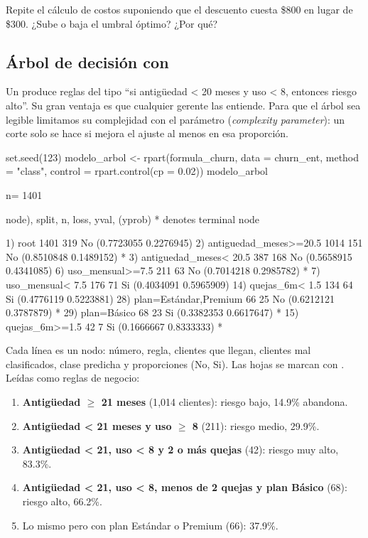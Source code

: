 \begin{hazlotu}
Repite el cálculo de costos suponiendo que el descuento cuesta \$800 en lugar
de \$300. ¿Sube o baja el umbral óptimo? ¿Por qué?
\end{hazlotu}

\subsection{Árbol de decisión con \texorpdfstring{}{rpart}}

Un  produce reglas del tipo ``si antigüedad < 20
meses y uso < 8, entonces riesgo alto''. Su gran ventaja es que cualquier
gerente las entiende. Para que el árbol sea legible limitamos su complejidad
con el parámetro  (\emph{complexity parameter}): un corte solo se
hace si mejora el ajuste al menos en esa proporción.

\begin{rcode}
set.seed(123)
modelo_arbol <- rpart(formula_churn, data = churn_ent, method = "class",
                      control = rpart.control(cp = 0.02))
modelo_arbol
\end{rcode}

\begin{rsalida}
n= 1401 

node), split, n, loss, yval, (yprob)
      * denotes terminal node

 1) root 1401 319 No (0.7723055 0.2276945)  
   2) antiguedad_meses>=20.5 1014 151 No (0.8510848 0.1489152) *
   3) antiguedad_meses< 20.5 387 168 No (0.5658915 0.4341085)  
     6) uso_mensual>=7.5 211  63 No (0.7014218 0.2985782) *
     7) uso_mensual< 7.5 176  71 Si (0.4034091 0.5965909)  
      14) quejas_6m< 1.5 134  64 Si (0.4776119 0.5223881)  
        28) plan=Estándar,Premium 66  25 No (0.6212121 0.3787879) *
        29) plan=Básico 68  23 Si (0.3382353 0.6617647) *
      15) quejas_6m>=1.5 42   7 Si (0.1666667 0.8333333) *
\end{rsalida}

Cada línea es un nodo: número, regla, clientes que llegan, clientes mal
clasificados, clase predicha y proporciones (No, Si). Las hojas se marcan con
\codigo{*}. Leídas como reglas de negocio:

\begin{enumerate}
  \item \textbf{Antigüedad $\geq$ 21 meses} (1{,}014 clientes): riesgo bajo,
        14.9\% abandona.
  \item \textbf{Antigüedad < 21 meses y uso $\geq$ 8} (211): riesgo medio,
        29.9\%.
  \item \textbf{Antigüedad < 21, uso < 8 y 2 o más quejas} (42): riesgo muy
        alto, 83.3\%.
  \item \textbf{Antigüedad < 21, uso < 8, menos de 2 quejas y plan Básico}
        (68): riesgo alto, 66.2\%.
  \item Lo mismo pero con plan Estándar o Premium (66): 37.9\%.
\end{enumerate}

